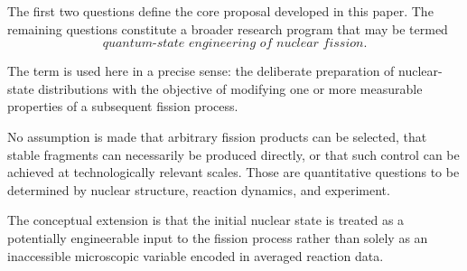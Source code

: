The first two questions define the core proposal developed in this paper. The remaining questions constitute a broader research program that may be termed
\begin{equation}
\boxed{
\textit{quantum-state engineering of nuclear fission}.
}
\end{equation}

The term is used here in a precise sense: the deliberate preparation of nuclear-state distributions with the objective of modifying one or more measurable properties of a subsequent fission process.

No assumption is made that arbitrary fission products can be selected, that stable fragments can necessarily be produced directly, or that such control can be achieved at technologically relevant scales. Those are quantitative questions to be determined by nuclear structure, reaction dynamics, and experiment.

The conceptual extension is that the initial nuclear state is treated as a potentially engineerable input to the fission process rather than solely as an inaccessible microscopic variable encoded in averaged reaction data.
